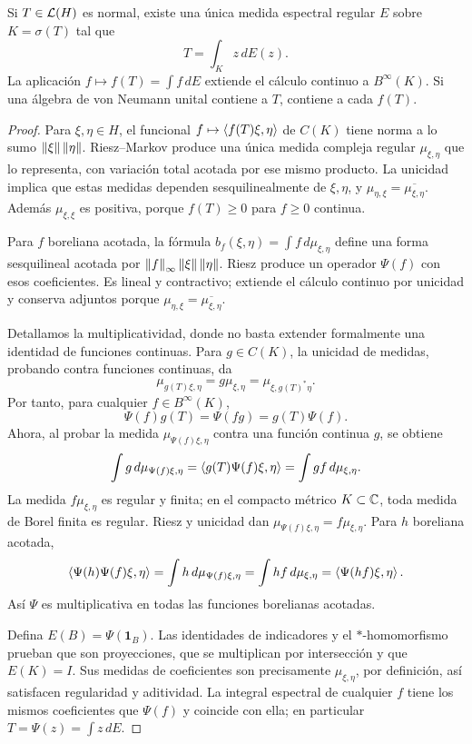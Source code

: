 \begin{teorema}\label{v3:espectral-borel}
Si $T\in\mathcal L(H)$ es normal, existe una única medida espectral regular $E$ sobre $K=\sigma(T)$ tal que
\[
 T=\int_K z\,dE(z).
\]
La aplicación $f\mapsto f(T)=\int f\,dE$ extiende el cálculo continuo a $B^\infty(K)$. Si una álgebra de von Neumann unital contiene a $T$, contiene a cada $f(T)$.
\end{teorema}
\begin{proof}
Para $\xi,\eta\in H$, el funcional $f\mapsto\left\langle f(T)\xi,\eta\right\rangle$ de $C(K)$ tiene norma a lo sumo $\left\lVert\xi\right\rVert\left\lVert\eta\right\rVert$. Riesz--Markov produce una única medida compleja regular $\mu_{\xi,\eta}$ que lo representa, con variación total acotada por ese mismo producto. La unicidad implica que estas medidas dependen sesquilinealmente de $\xi,\eta$, y $\mu_{\eta,\xi}=\overline{\mu_{\xi,\eta}}$. Además $\mu_{\xi,\xi}$ es positiva, porque $f(T)\ge0$ para $f\ge0$ continua.

Para $f$ boreliana acotada, la fórmula $b_f(\xi,\eta)=\int f\,d\mu_{\xi,\eta}$ define una forma sesquilineal acotada por $\left\lVert f\right\rVert_\infty\left\lVert\xi\right\rVert\left\lVert\eta\right\rVert$. Riesz produce un operador $\Psi(f)$ con esos coeficientes. Es lineal y contractivo; extiende el cálculo continuo por unicidad y conserva adjuntos porque $\mu_{\eta,\xi}=\overline{\mu_{\xi,\eta}}$.

Detallamos la multiplicatividad, donde no basta extender formalmente una identidad de funciones continuas. Para $g\in C(K)$, la unicidad de medidas, probando contra funciones continuas, da
\[
 \mu_{g(T)\xi,\eta}=g\mu_{\xi,\eta}
 =\mu_{\xi,g(T)^*\eta}.
\]
Por tanto, para cualquier $f\in B^\infty(K)$,
\[
 \Psi(f)g(T)=\Psi(fg)=g(T)\Psi(f).
\]
Ahora, al probar la medida $\mu_{\Psi(f)\xi,\eta}$ contra una función continua $g$, se obtiene
\[
 \int g\,d\mu_{\Psi(f)\xi,\eta}
 =\left\langle g(T)\Psi(f)\xi,\eta\right\rangle
 =\int gf\,d\mu_{\xi,\eta}.
\]
La medida $f\mu_{\xi,\eta}$ es regular y finita; en el compacto métrico $K\subset\mathbb C$, toda medida de Borel finita es regular. Riesz y unicidad dan $\mu_{\Psi(f)\xi,\eta}=f\mu_{\xi,\eta}$. Para $h$ boreliana acotada,
\[
 \left\langle\Psi(h)\Psi(f)\xi,\eta\right\rangle
 =\int h\,d\mu_{\Psi(f)\xi,\eta}
 =\int hf\,d\mu_{\xi,\eta}
 =\left\langle\Psi(hf)\xi,\eta\right\rangle.
\]
Así $\Psi$ es multiplicativa en todas las funciones borelianas acotadas.

Defina $E(B)=\Psi(\mathbf1_B)$. Las identidades de indicadores y el $*$-homomorfismo prueban que son proyecciones, que se multiplican por intersección y que $E(K)=I$. Sus medidas de coeficientes son precisamente $\mu_{\xi,\eta}$, por definición, así satisfacen regularidad y aditividad. La integral espectral de cualquier $f$ tiene los mismos coeficientes que $\Psi(f)$ y coincide con ella; en particular $T=\Psi(z)=\int z\,dE$.


\end{proof}
